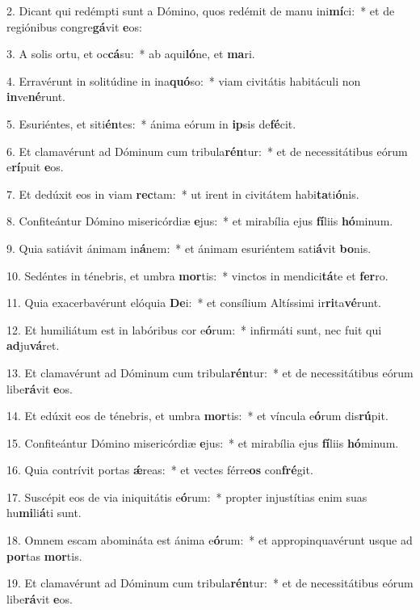 2. Dicant qui redémpti sunt a Dómino, quos redémit de manu ini\textbf{mí}ci:~*  et de regiónibus congre\textbf{gá}vit \textbf{e}os:\

3. A solis ortu, et oc\textbf{cá}su:~*  ab aqui\textbf{ló}ne, et \textbf{ma}ri.\

4. Erravérunt in solitúdine in ina\textbf{quó}so:~*  viam civitátis habitáculi non \textbf{in}ve\textbf{né}runt.\

5. Esuriéntes, et siti\textbf{én}tes:~*  ánima eórum in \textbf{ip}sis de\textbf{fé}cit.\

6. Et clamavérunt ad Dóminum cum tribula\textbf{rén}tur:~*  et de necessitátibus eórum e\textbf{rí}puit \textbf{e}os.\

7. Et dedúxit eos in viam \textbf{rec}tam:~*  ut irent in civitátem habi\textbf{ta}ti\textbf{ó}nis.\

8. Confiteántur Dómino misericórdiæ \textbf{e}jus:~*  et mirabília ejus \textbf{fí}liis \textbf{hó}minum.\

9. Quia satiávit ánimam in\textbf{á}nem:~*  et ánimam esuriéntem sati\textbf{á}vit \textbf{bo}nis.\

10. Sedéntes in ténebris, et umbra \textbf{mor}tis:~*  vinctos in mendici\textbf{tá}te et \textbf{fer}ro.\

11. Quia exacerbavérunt elóquia \textbf{De}i:~*  et consílium Altíssimi ir\textbf{ri}ta\textbf{vé}runt.\

12. Et humiliátum est in labóribus cor e\textbf{ó}rum:~*  infirmáti sunt, nec fuit qui \textbf{ad}ju\textbf{vá}ret.\

13. Et clamavérunt ad Dóminum cum tribula\textbf{rén}tur:~*  et de necessitátibus eórum libe\textbf{rá}vit \textbf{e}os.\

14. Et edúxit eos de ténebris, et umbra \textbf{mor}tis:~*  et víncula e\textbf{ó}rum dis\textbf{rú}pit.\

15. Confiteántur Dómino misericórdiæ \textbf{e}jus:~*  et mirabília ejus \textbf{fí}liis \textbf{hó}minum.\

16. Quia contrívit portas \textbf{ǽ}reas:~*  et vectes férre\textbf{os} con\textbf{fré}git.\

17. Suscépit eos de via iniquitátis e\textbf{ó}rum:~*  propter injustítias enim suas hu\textbf{mi}li\textbf{á}ti sunt.\

18. Omnem escam abomináta est ánima e\textbf{ó}rum:~*  et appropinquavérunt usque ad \textbf{por}tas \textbf{mor}tis.\

19. Et clamavérunt ad Dóminum cum tribula\textbf{rén}tur:~*  et de necessitátibus eórum libe\textbf{rá}vit \textbf{e}os.\

